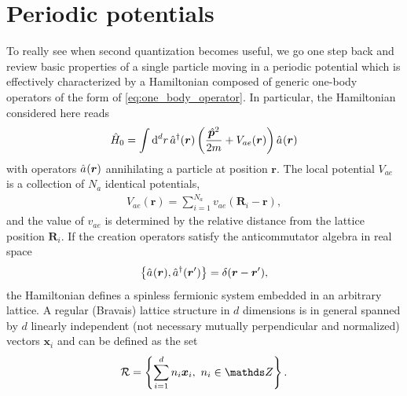 \section{Periodic potentials}
\label{sec:periodic_potentials}
To really see when second quantization becomes useful, we go one step back and review basic properties of a single particle moving in a periodic potential which is effectively characterized by a Hamiltonian composed of generic one-body operators of the form of \cref{eq:one_body_operator}.
In particular, the Hamiltonian considered here reads
\begin{align}
    \hat H_0 = \int\rd^d r\, \hat a^\dag({\bm r})\brlr{\frac{\hat{\bm p}^2}{2m}+V_{ae}({\bm r})}\hat a^\pdag({\bm r})
\end{align}
with operators $\hat a^\pdag({\bm r})$ annihilating a particle at position $\bm r$.
The local potential $V_{ae}$ is a collection of $N_a$ identical potentials,
\begin{align}
    V_{ae}({\bm r}) = \sum_{i=1}^{N_a}v_{ae}({\bm R}_i - {\bm r}),
\end{align}
and the value of $v_{ae}$ is determined by the relative distance from the lattice position ${\bm R}_i$.
If the creation operators satisfy the anticommutator algebra in real space
\begin{align}
    \anticommutator{\hat a^\pdag({\bm r}),\hat a^\dag({\bm r'})}=\delta({\bm r}-{\bm r'}),
\end{align}
the Hamiltonian defines a spinless fermionic system embedded in an arbitrary lattice.
A regular (Bravais) lattice structure in $d$ dimensions is in general spanned by $d$ linearly independent (not necessary mutually perpendicular and normalized) vectors ${\bm x}_i$ and can be defined as the set
\begin{align}
    \mathcal{R} = \anticommutator{\sum_{i=1}^d n_i {\bm x}_i,\ n_i\in\mathds Z}.
\end{align}
